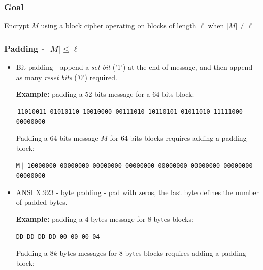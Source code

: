 \documentclass[aspectratio=169, lualatex, 10pt,dvipsnames,svgnames]{beamer} %
\def\envert#1{\textcolor{vert}{#1}}
\def\enbleu#1{\textcolor{bleu}{#1}}
\def\enrouge#1{\textcolor{rouge}{#1}}
\begin{document}
\date{}
\author{}

\begin{frame}
  \maketitle
\end{frame}

\begin{frame}
  \frametitle{Goal}

  \begin{block}{}
    Encrypt $M$ using a block cipher operating on blocks of length $\ell$ when \enrouge{$|M|\not=\ell$}
  \end{block}
\end{frame}

\begin{frame}
  \frametitle{Padding - $|M| \le \ell$}
\vspace{-0.4cm}

  \begin{itemize}
  \item \enbleu{Bit padding -} append a \emph{set bit} ('1') at the end of message, and then append as many \emph{reset bits} ('0') required.\smallskip

    \scriptsize

    \envert{\textbf{Example:} padding a 52-bits message for a 64-bits block:}

    \;\;\;\,\mbox{\envert{\texttt{11010011 01010110 10010000 00111010 10110101 01011010 1111{\enrouge{1000 00000000}}}}}\smallskip

    \envert{Padding a $64$-bits message $M$ for 64-bits blocks requires adding a padding block:}
    \vspace{-1.5mm}

    \texttt{\envert{M$\|$\enrouge{10000000 00000000 00000000 00000000 00000000 00000000 00000000 00000000}}}
    \medskip{}
    \pause
    \normalsize
    
  \item \enbleu{ANSI X.923 - } byte padding - pad with zeros, the last byte defines the number of padded bytes.\smallskip

    \scriptsize

    \envert{\textbf{Example:} padding a 4-bytes message for 8-bytes blocks:}
    
    \texttt{\envert{DD DD DD DD \enrouge{00 00 00 04}}}\smallskip

    \envert{Padding a $8k$-bytes messages for 8-bytes blocks requires adding a padding block:}


\end{itemize}
\end{frame}
\end{document}
